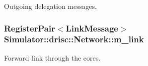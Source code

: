Outgoing delegation messages. 

\hypertarget{class_simulator_1_1drisc_1_1_network_ab1b03a347b36fa3b13dccb4b0de6ab32}{
\subsubsection[{m\+\_\+link}]{\setlength{\rightskip}{0pt plus 5cm}Register\+Pair$<${\bf Link\+Message}$>$ Simulator\+::drisc\+::\+Network\+::m\+\_\+link}}\label{class_simulator_1_1drisc_1_1_network_ab1b03a347b36fa3b13dccb4b0de6ab32}


Forward link through the cores. 

